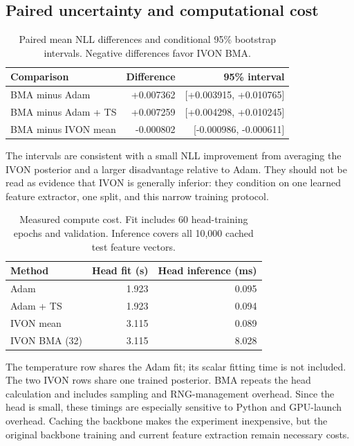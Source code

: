 \documentclass[11pt,a4paper]{article}
\begin{document}
\subsection{Paired uncertainty and computational cost}
\begin{table}[H]\centering\small
\caption{Paired mean NLL differences and conditional 95\% bootstrap intervals.
Negative differences favor IVON BMA.}
\begin{tabular}{lrr}\toprule
Comparison & Difference & 95\% interval \\\midrule
BMA minus Adam & +0.007362 & [+0.003915, +0.010765] \\
BMA minus Adam + TS & +0.007259 & [+0.004298, +0.010245] \\
BMA minus IVON mean & -0.000802 & [-0.000986, -0.000611] \\
\bottomrule\end{tabular}\end{table}
The intervals are consistent with a small NLL improvement from averaging the
IVON posterior and a larger disadvantage relative to Adam. They should not be
read as evidence that IVON is generally inferior: they condition on one learned
feature extractor, one split, and this narrow training protocol.

\begin{table}[H]\centering\small
\caption{Measured compute cost. Fit includes 60 head-training epochs and
validation. Inference covers all 10,000 cached test feature vectors.}
\begin{tabular}{lrr}\toprule
Method & Head fit (s) & Head inference (ms) \\\midrule
Adam & 1.923 & 0.095 \\
Adam + TS & 1.923 & 0.094 \\
IVON mean & 3.115 & 0.089 \\
IVON BMA (32) & 3.115 & 8.028 \\
\bottomrule\end{tabular}\end{table}
The temperature row shares the Adam fit; its scalar fitting time is not included.
The two IVON rows share one trained posterior. BMA repeats the head calculation
and includes sampling and RNG-management overhead. Since the head is small,
these timings are especially sensitive to Python and GPU-launch overhead.
Caching the backbone makes the experiment inexpensive, but the original backbone
training and current feature extraction remain necessary costs.

\FloatBarrier
\end{document}
